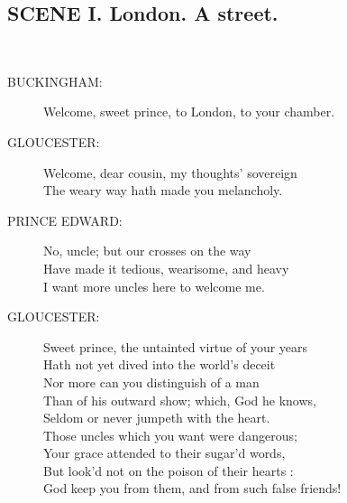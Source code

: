 \documentclass{article}
\begin{document}
\subsection*{SCENE I.  London. A street.}
\\
\begin{description}
\item[BUCKINGHAM:] 
\hspace{1pt}Welcome, sweet prince, to London, to your chamber.\\
\end{description}
\begin{description}
\item[GLOUCESTER:] 
\hspace{1pt}Welcome, dear cousin, my thoughts' sovereign\\
\hspace{1pt}The weary way hath made you melancholy.\\
\end{description}
\begin{description}
\item[PRINCE EDWARD:] 
\hspace{1pt}No, uncle; but our crosses on the way\\
\hspace{1pt}Have made it tedious, wearisome, and heavy\\
\hspace{1pt}I want more uncles here to welcome me.\\
\end{description}
\begin{description}
\item[GLOUCESTER:] 
\hspace{1pt}Sweet prince, the untainted virtue of your years\\
\hspace{1pt}Hath not yet dived into the world's deceit\\
\hspace{1pt}Nor more can you distinguish of a man\\
\hspace{1pt}Than of his outward show; which, God he knows,\\
\hspace{1pt}Seldom or never jumpeth with the heart.\\
\hspace{1pt}Those uncles which you want were dangerous;\\
\hspace{1pt}Your grace attended to their sugar'd words,\\
\hspace{1pt}But look'd not on the poison of their hearts :\\
\hspace{1pt}God keep you from them, and from such false friends!\\
\end{description}
\end{document}
